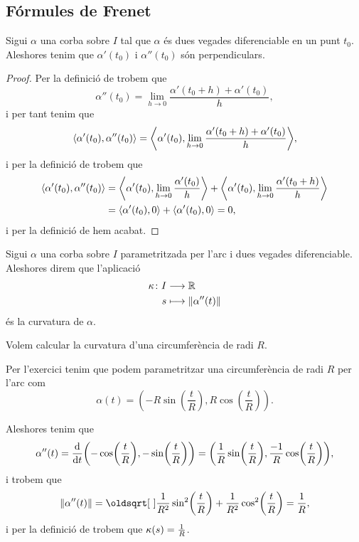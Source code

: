 \documentclass[../Apunts.tex]{subfiles}
\begin{document}
	\subsection{Fórmules de Frenet}
	\begin{proposition}
		\label{prop:la primera derivada i la segona derivada d'una corba són perpendiculars}
		Sigui \(\alpha\) una corba sobre \(I\) tal que \(\alpha\) és dues vegades diferenciable en un punt \(t_{0}\). Aleshores tenim que \(\alpha'(t_{0})\) i \(\alpha''(t_{0})\) són perpendiculars.
		\begin{proof}
			Per la definició de  trobem que
			\[\alpha''(t_{0})=\lim_{h\to0}\frac{\alpha'(t_{0}+h)+\alpha'(t_{0})}{h},\]
			i per tant tenim que
			\[\prodesc{\alpha'(t_{0})}{\alpha''(t_{0})}=\prodesc{\alpha'(t_{0})}{\lim_{h\to0}\frac{\alpha'(t_{0}+h)+\alpha'(t_{0})}{h}},\]
			i per la definició de  trobem que
			\begin{align*}
				\prodesc{\alpha'(t_{0})}{\alpha''(t_{0})}	&=\prodesc{\alpha'(t_{0})}{\lim_{h\to0}\frac{\alpha'(t_{0})}{h}}+\prodesc{\alpha'(t_{0})}{\lim_{h\to0}\frac{\alpha'(t_{0}+h)}{h}} \\
				&=\prodesc{\alpha'(t_{0})}{0}+\prodesc{\alpha'(t_{0})}{0}=0,
			\end{align*}
			i per la definició de  hem acabat.
		\end{proof}
	\end{proposition}
	\begin{definition}[Curvatura]
		\label{def:curvatura}
		Sigui \(\alpha\) una corba sobre \(I\) parametritzada per l'arc i dues vegades diferenciable. Aleshores direm que l'aplicació
		\begin{align*}
			\curvatura\colon I&\longrightarrow\mathbb{R} \\
			s&\longmapsto\norm{\alpha''(t)}
		\end{align*}
		és la curvatura de \(\alpha\).
	\end{definition}
	\begin{example}
		\label{ex:curvatura de la circumferència}
		Volem calcular la curvatura d'una circumferència de radi \(R\).
		\begin{solution}
			Per l'exercici  tenim que podem parametritzar una circumferència de radi \(R\) per l'arc com
			\[\alpha(t)=\left(-R\sin\left(\frac{t}{R}\right),R\cos\left(\frac{t}{R}\right)\right).\]
			
			Aleshores tenim que
			\[\alpha''(t)=\frac{\diff}{\diff t}\left(-\cos\left(\frac{t}{R}\right),-\sin\left(\frac{t}{R}\right)\right)=\left(\frac{1}{R}\sin\left(\frac{t}{R}\right),\frac{-1}{R}\cos\left(\frac{t}{R}\right)\right),\]
			i trobem que
			\[\norm{\alpha''(t)}=\sqrt{\frac{1}{R^{2}}\sin^{2}\left(\frac{t}{R}\right)+\frac{1}{R^{2}}\cos^{2}\left(\frac{t}{R}\right)}=\frac{1}{R},\]
			i per la definició de  trobem que \(\operatorname{\kappa}(s)=\frac{1}{R}\).
		\end{solution}
	\end{example}
\end{document}
